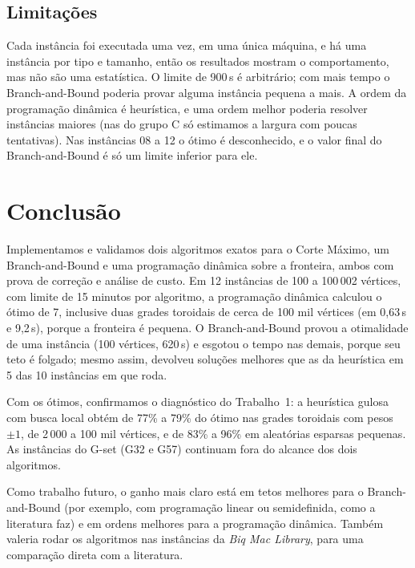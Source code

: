 \subsection{Limitações}

Cada instância foi executada uma vez, em uma única máquina, e há uma instância por tipo e tamanho, então os resultados mostram o comportamento, mas não são uma estatística. O limite de 900\,s é arbitrário; com mais tempo o Branch-and-Bound poderia provar alguma instância pequena a mais. A ordem da programação dinâmica é heurística, e uma ordem melhor poderia resolver instâncias maiores (nas do grupo C só estimamos a largura com poucas tentativas). Nas instâncias 08 a 12 o ótimo é desconhecido, e o valor final do Branch-and-Bound é só um limite inferior para ele.

\section{Conclusão}

Implementamos e validamos dois algoritmos exatos para o Corte Máximo, um Branch-and-Bound e uma programação dinâmica sobre a fronteira, ambos com prova de correção e análise de custo. Em 12 instâncias de 100 a 100\,002 vértices, com limite de 15 minutos por algoritmo, a programação dinâmica calculou o ótimo de 7, inclusive duas grades toroidais de cerca de 100 mil vértices (em 0,63\,s e 9,2\,s), porque a fronteira é pequena. O Branch-and-Bound provou a otimalidade de uma instância (100 vértices, 620\,s) e esgotou o tempo nas demais, porque seu teto é folgado; mesmo assim, devolveu soluções melhores que as da heurística em 5 das 10 instâncias em que roda.

Com os ótimos, confirmamos o diagnóstico do Trabalho~1: a heurística gulosa com busca local obtém de 77\% a 79\% do ótimo nas grades toroidais com pesos $\pm1$, de 2\,000 a 100 mil vértices, e de 83\% a 96\% em aleatórias esparsas pequenas. As instâncias do G-set (G32 e G57) continuam fora do alcance dos dois algoritmos.

Como trabalho futuro, o ganho mais claro está em tetos melhores para o Branch-and-Bound (por exemplo, com programação linear ou semidefinida, como a literatura faz) e em ordens melhores para a programação dinâmica. Também valeria rodar os algoritmos nas instâncias da \emph{Biq Mac Library}, para uma comparação direta com a literatura.
